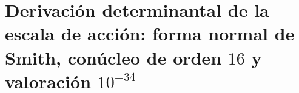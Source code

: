 \chapter{Derivación determinantal de la escala de acción: forma normal de Smith, conúcleo de orden \(16\) y valoración \(10^{-34}\)}
\label{chap:p3-final:34:escala_accion}

